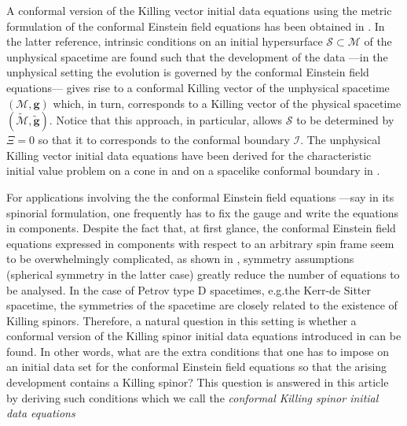 \documentclass[10pt,a4paper]{article}
\theoremstyle{plain}
\def\bmg{{\bm g}}
\begin{document}
\medskip

A conformal version of the Killing vector initial data equations using
the metric formulation of the conformal Einstein field equations has
been obtained in \cite{Pae14a}.  In the latter reference, intrinsic
conditions on an initial hypersurface $\mathcal{S}\subset \mathcal{M}$
of the unphysical spacetime are found such that the development of the
data ---in the unphysical setting the evolution is governed by the
conformal Einstein field equations--- gives rise to a conformal
Killing vector of the unphysical spacetime $(\mathcal{M},\bmg)$ which, in
turn, corresponds to a Killing vector of the physical spacetime
$(\tilde{\mathcal{M}},\tilde{\bmg})$.  Notice that this approach, in
particular, allows $\mathcal{S}$ to be determined by $\Xi=0$ so that
it to corresponds to the conformal boundary $\mathscr{I}$.  The
unphysical Killing vector initial data equations have been derived for
the characteristic initial value problem on a cone in \cite{Pae14a}
and on a spacelike conformal boundary in \cite{Pae14}.


\medskip
For applications involving the the conformal Einstein field equations
---say in its spinorial formulation, one frequently has to fix the
gauge and write the equations in components.  Despite the fact that,
at first glance, the conformal Einstein field equations expressed in
components with respect to an arbitrary spin frame seem to be
overwhelmingly complicated, as shown in \cite{GasVal17}, symmetry
assumptions (spherical symmetry in the latter case) greatly reduce the
number of equations to be analysed.  In the case of Petrov type D
spacetimes, e.g.the Kerr-de Sitter spacetime, the symmetries of the
spacetime are closely related to the existence of Killing spinors.
Therefore, a natural question in this setting is whether a conformal
version of the Killing spinor initial data equations introduced in
\cite{GarVal08c} can be found. In other words, what are the extra
conditions that one has to impose on an initial data set for the
conformal Einstein field equations so that the arising development
contains a Killing spinor?  This question is answered in this article
by deriving such conditions which we call the \emph{conformal Killing
  spinor initial data equations}
\end{document}
